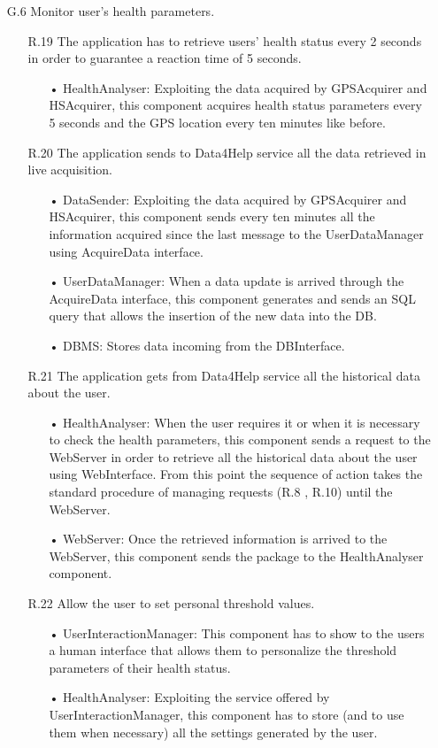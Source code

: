 \begin{enumerate}
\item [G.6] Monitor user's health parameters.
	\begin{enumerate}
	\item [R.19] The application has to retrieve users' health status every 2 seconds in order to guarantee a reaction time of 5 seconds.
		\begin{enumerate}
		\item[•] HealthAnalyser: Exploiting the data acquired by GPSAcquirer and HSAcquirer, this component acquires health status parameters every 5 seconds and the GPS location every ten minutes like before.
		\end{enumerate}	
	\item [R.20] The application sends to Data4Help service all the data retrieved in live acquisition.
		\begin{enumerate}
		\item[•] DataSender: Exploiting the data acquired by GPSAcquirer and HSAcquirer, this component sends every ten minutes all the information acquired since the last message to the UserDataManager using AcquireData interface.
		\item[•] UserDataManager: When a data update is arrived through the AcquireData interface, this component generates and sends an SQL query that allows the insertion of the new data into the DB.
		\item[•] DBMS: Stores data incoming from the DBInterface.
		\end{enumerate}	
	\item [R.21] The application gets from Data4Help service all the historical data about the user.
		\begin{enumerate}
		\item[•] HealthAnalyser: When the user requires it or when it is necessary to check the health parameters, this component sends a request to the WebServer in order to retrieve all the historical data about the user using WebInterface. From this point the sequence of action takes the standard procedure of managing requests (R.8 , R.10) until the WebServer.
		\item[•] WebServer: Once the retrieved information is arrived to the WebServer, this component sends the package to the HealthAnalyser component.
		\end{enumerate}
	\item [R.22] Allow the user to set personal threshold values.
		\begin{enumerate}
		\item[•] UserInteractionManager: This component has to show to the users a human interface that allows them to personalize the threshold parameters of their health status.
		\item[•] HealthAnalyser: Exploiting the service offered by UserInteractionManager, this component has to store (and to use them when necessary) all the settings generated by the user.
		\end{enumerate}
	\end{enumerate}


\end{enumerate}
